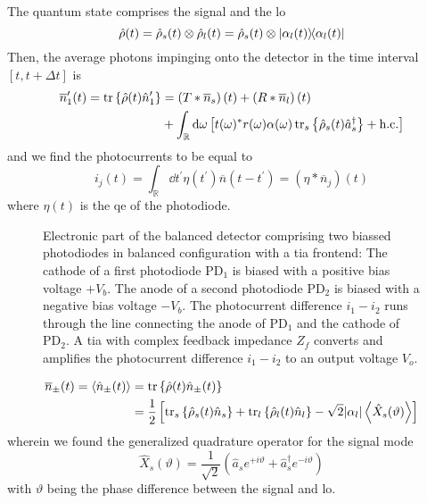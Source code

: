 The quantum state comprises the signal and the \gls{lo}~\cite[p.~213]{Vogel2006}
\begin{equation}
	\hat\rho(t)
	=
	\hat\rho_s(t)
	\otimes
	\hat\rho_l(t)
	=
	\hat\rho_s(t)
	\otimes
	\ketbra{\alpha_l(t)}
\end{equation}
Then, the average photons impinging onto the detector in the time interval $[t,t+\Delta t]$ is
\begin{equation}
	\begin{split}
		\overline{n}_1^\prime(t)
		=
		\tr\left\{
			\hat\rho(t)
			\hat{n}_1^\prime
		\right\}
		&=
		\left(T*\overline{n}_s\right)(t)
		+
		\left(R*\overline{n}_l\right)(t)
		\\
		&+
		\int_\mathbb{R}\dd{\omega}
		\left[
			t(\omega)^*
			r(\omega)
			\alpha(\omega)
			\tr_s\left\{
				\hat\rho_s(t)
				\hat{a}_s^\dagger
			\right\}
			+
			\text{h.c.}
		\right]
	\end{split}
\end{equation}
and we find the photocurrents to be equal to
\begin{equation}
	i_j(t)
	=
	\int_{\mathbb{R}}\dd{t^\prime}
	\eta(t^\prime)
	\overline{n}(t-t^\prime)
	=
	\left(\eta*\overline{n}_j\right)(t)
\end{equation}
where $\eta(t)$ is the \gls{qe} of the photodiode.
\begin{figure}[htb]
    \centering
    
    \caption{Electronic part of the balanced detector comprising two biassed photodiodes in balanced configuration with a \gls{tia} frontend: The cathode of a first photodiode $\text{PD}_1$ is biased with a positive bias voltage $+V_b$. The anode of a second photodiode $\text{PD}_2$ is biased with a negative bias voltage $-V_b$. The photocurrent difference $i_1-i_2$ runs through the line connecting the anode of $\text{PD}_1$ and the cathode of $\text{PD}_2$. A \gls{tia} with complex feedback impedance $Z_f$ converts and amplifies the photocurrent difference $i_1-i_2$ to an output voltage $V_o$.}\label{fig:balanced_detector_electronics}
\end{figure}

\begin{equation}
	\begin{split}
		\overline{n}_\pm(t)
		=
		\expval{\hat{n}_\pm(t)}
		&=
		\tr\left\{
			\hat\rho(t)
			\hat{n}_\pm(t)
		\right\}
		\\
		&=
		\frac{1}{2}
		\left[
			\tr_s\left\{
				\hat\rho_s(t)
				\hat{n}_s
			\right\}
			+
			\tr_l\left\{
				\hat\rho_l(t)
				\hat{n}_l
			\right\}
			-
			\sqrt{2}
			\abs{\alpha_l}
			\expval{\hat{X}_s(\vartheta)}
		\right]
	\end{split}
\end{equation}
wherein we found the generalized quadrature operator for the signal mode
\begin{equation}
	\hat{X}_s(\vartheta)
	=
	\frac{1}{\sqrt{2}}
	\left(
		\hat{a}_s
		e^{+i\vartheta}
		+
		\hat{a}_s^\dagger
		e^{-i\vartheta}
	\right)
\end{equation}
with $\vartheta$ being the phase difference between the signal and \gls{lo}.

